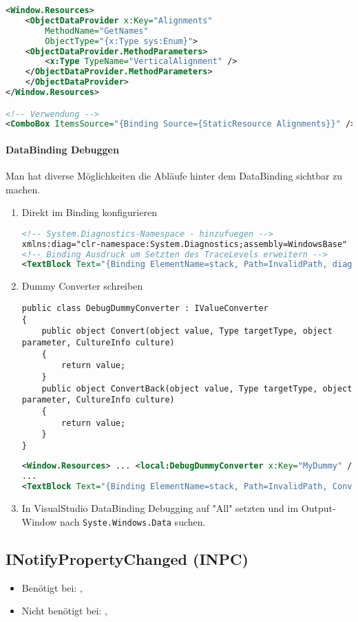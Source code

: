 \begin{lstlisting}[language=xml]
<Window.Resources>
    <ObjectDataProvider x:Key="Alignments"
        MethodName="GetNames"
        ObjectType="{x:Type sys:Enum}">
    <ObjectDataProvider.MethodParameters>
        <x:Type TypeName="VerticalAlignment" />
    </ObjectDataProvider.MethodParameters>
    </ObjectDataProvider>
</Window.Resources>

<!-- Verwendung -->
<ComboBox ItemsSource="{Binding Source={StaticResource Alignments}}" />
\end{lstlisting}
\paragraph{DataBinding Debuggen} Man hat diverse Möglichkeiten die Abläufe hinter dem DataBinding sichtbar zu machen.
\begin{enumerate}
\item Direkt im Binding konfigurieren
\begin{lstlisting}[language=xml]
<!-- System.Diagnostics-Namespace - hinzufuegen -->
xmlns:diag="clr-namespace:System.Diagnostics;assembly=WindowsBase"
<!-- Binding Ausdruck um Setzten des TraceLevels erweitern -->
<TextBlock Text="{Binding ElementName=stack, Path=InvalidPath, diag:PresentationTraceSources.TraceLevel=High}" />
\end{lstlisting}
\item Dummy Converter schreiben
\begin{lstlisting}
public class DebugDummyConverter : IValueConverter
{
    public object Convert(object value, Type targetType, object parameter, CultureInfo culture)
    {
        return value;
    }
    public object ConvertBack(object value, Type targetType, object parameter, CultureInfo culture)
    {
        return value;
    }
}
\end{lstlisting}
\begin{lstlisting}[language=xml]
<Window.Resources> ... <local:DebugDummyConverter x:Key="MyDummy" /> ... </Window.Resources>
...
<TextBlock Text="{Binding ElementName=stack, Path=InvalidPath, Converter={StaticResource MyDummy}}" />
\end{lstlisting}
\item In VisualStudio DataBinding Debugging auf "{}All"{} setzten und im Output-Window nach \verb+Syste.Windows.Data+ suchen.
\end{enumerate}

\subsection{INotifyPropertyChanged (INPC)}
\begin{itemize}
    \item Benötigt bei: , 
    \item Nicht benötigt bei: , 
\end{itemize}




